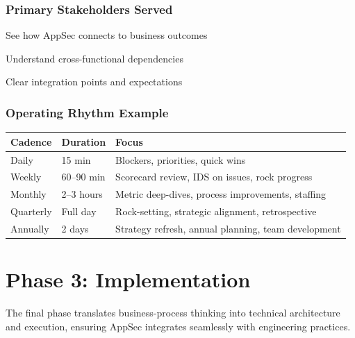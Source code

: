 \documentclass[11pt,letterpaper]{article}
\begin{document}
\subsubsection{Primary Stakeholders Served}

\begin{stakeholderbox}
\begin{description}[nosep, leftmargin=3cm]
    \item[Executives] See how AppSec connects to business outcomes
    \item[Portfolio/Program Mgmt] Understand cross-functional dependencies
    \item[Eng Leadership] Clear integration points and expectations
\end{description}
\end{stakeholderbox}

\subsubsection{Operating Rhythm Example}

\begin{center}
\renewcommand{\arraystretch}{1.3}
\begin{tabular}{llp{7cm}}
\toprule
\textbf{Cadence} & \textbf{Duration} & \textbf{Focus} \\
\midrule
Daily & 15 min & Blockers, priorities, quick wins \\
Weekly & 60--90 min & Scorecard review, IDS on issues, rock progress \\
Monthly & 2--3 hours & Metric deep-dives, process improvements, staffing \\
Quarterly & Full day & Rock-setting, strategic alignment, retrospective \\
Annually & 2 days & Strategy refresh, annual planning, team development \\
\bottomrule
\end{tabular}
\end{center}

\newpage

\section{Phase 3: Implementation}

The final phase translates business-process thinking into technical architecture and execution, ensuring AppSec integrates seamlessly with engineering practices.
\end{document}
